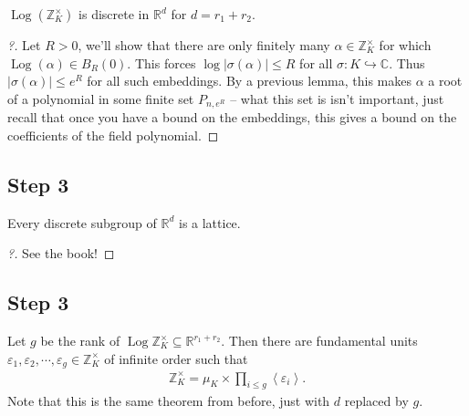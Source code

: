 \begin{proposition}[?]

\(\operatorname{Log}({\mathbb{Z}}_K^{\times})\) is discrete in
\({\mathbb{R}}^d\) for \(d=r_1 + r_2\).

\end{proposition}

\begin{proof}[?]

Let \(R>0\), we'll show that there are only finitely many
\(\alpha \in {\mathbb{Z}}_K^{\times}\) for which
\(\operatorname{Log}(\alpha) \in B_R(0)\). This forces
\(\log{\left\lvert {\sigma(\alpha)} \right\rvert} \leq R\) for all
\(\sigma: K\hookrightarrow{\mathbb{C}}\). Thus
\({\left\lvert {\sigma(\alpha)} \right\rvert} \leq e^R\) for all such
embeddings. By a previous lemma, this makes \(\alpha\) a root of a
polynomial in some finite set \(P_{n,e^R}\) -- what this set is isn't
important, just recall that once you have a bound on the embeddings,
this gives a bound on the coefficients of the field polynomial.

\end{proof}

\hypertarget{step-3}{%
\subsection{Step 3}\label{step-3}}

\begin{theorem}[?]

Every discrete subgroup of \({\mathbb{R}}^d\) is a lattice.

\end{theorem}

\begin{proof}[?]

See the book!

\end{proof}

\hypertarget{step-3-1}{%
\subsection{Step 3}\label{step-3-1}}

\begin{theorem}

Let \(g\) be the rank of
\(\operatorname{Log}{\mathbb{Z}}_K^{\times}\subseteq {\mathbb{R}}^{r_1 + r_2}\).
Then there are fundamental units
\({ {\varepsilon}_1, {\varepsilon}_2, \cdots, {\varepsilon}_{g}} \in {\mathbb{Z}}_K^{\times}\)
of infinite order such that
\begin{align*}
{\mathbb{Z}}_K^{\times}= \mu_K \times \prod_{i\leq g} \left\langle{ \varepsilon_i }\right\rangle 
.\end{align*}
Note that this is the same theorem from before, just with \(d\) replaced
by \(g\).

\end{theorem}

